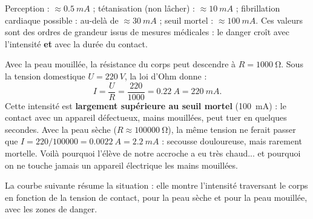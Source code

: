 \documentclass[11pt]{article}
\begin{document}
\begin{aretenir}
Perception : $\approx \SI{0,5}{mA}$ ; tétanisation (non lâcher) : $\approx \SI{10}{mA}$ ; fibrillation cardiaque possible : au-delà de $\approx \SI{30}{mA}$ ; seuil mortel : $\approx \SI{100}{mA}$. Ces valeurs sont des ordres de grandeur issus de mesures médicales : le danger croît avec l'intensité \textbf{et} avec la durée du contact.
\end{aretenir}

\begin{exemplebox}
Avec la peau mouillée, la résistance du corps peut descendre à $R = \SI{1000}{\ohm}$. Sous la tension domestique $U = \SI{220}{V}$, la loi d'Ohm donne :
\[ I = \frac{U}{R} = \frac{220}{1000} = \SI{0,22}{A} = \SI{220}{mA}. \]
Cette intensité est \textbf{largement supérieure au seuil mortel} (\SI{100}{mA}) : le contact avec un appareil défectueux, mains mouillées, peut tuer en quelques secondes. Avec la peau sèche ($R \approx \SI{100000}{\ohm}$), la même tension ne ferait passer que $I = 220/100000 = \SI{0,0022}{A} = \SI{2,2}{mA}$ : secousse douloureuse, mais rarement mortelle. Voilà pourquoi l'élève de notre accroche a eu très chaud... et pourquoi on ne touche jamais un appareil électrique les mains mouillées.
\end{exemplebox}

La courbe suivante résume la situation : elle montre l'intensité traversant le corps en fonction de la tension de contact, pour la peau sèche et pour la peau mouillée, avec les zones de danger.
\end{document}
